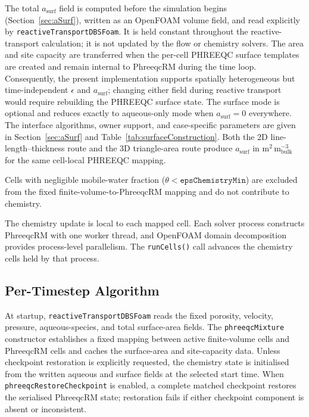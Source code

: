 The total $a_{\mathrm{surf}}$ field is computed before the simulation begins
(Section~\ref{sec:aSurf}), written as an OpenFOAM volume field, and read
explicitly by \texttt{reactiveTransportDBSFoam}. It is held constant throughout
the reactive-transport calculation; it is not updated by the flow or chemistry
solvers. The area and site capacity are transferred when the per-cell
PHREEQC surface templates are created and remain internal to PhreeqcRM during
the time loop. Consequently, the present implementation supports spatially
heterogeneous but time-independent $\epsilon$ and $a_{\mathrm{surf}}$; changing
either field during reactive transport would require rebuilding the PHREEQC
surface state. The surface mode is optional and reduces exactly to
aqueous-only mode when $a_{\mathrm{surf}} = 0$ everywhere.
The interface algorithms, owner support, and case-specific parameters are given
in Section~\ref{sec:aSurf} and Table~\ref{tab:surfaceConstruction}. Both the 2D
line-length--thickness route and the 3D triangle-area route produce
$a_{\mathrm{surf}}$ in m$^2$\,m$^{-3}_{\mathrm{bulk}}$ for the same
cell-local PHREEQC mapping.

Cells with negligible mobile-water fraction
($\theta < \texttt{epsChemistryMin}$) are excluded from the fixed
finite-volume-to-PhreeqcRM mapping and do not contribute to chemistry.

The chemistry update is local to each mapped cell. Each solver process
constructs PhreeqcRM with one worker thread, and OpenFOAM domain decomposition
provides process-level parallelism.
The \texttt{runCells()} call advances the chemistry cells held by that process.

\subsection{Per-Timestep Algorithm}

At startup, \texttt{reactiveTransportDBSFoam} reads the fixed porosity,
velocity, pressure, aqueous-species, and total surface-area fields. The
\texttt{phreeqcMixture} constructor establishes a fixed mapping between active
finite-volume cells and PhreeqcRM cells and caches the surface-area and
site-capacity data. Unless checkpoint restoration is explicitly requested, the
chemistry state is initialised from the written aqueous and surface fields at
the selected start time. When \texttt{phreeqcRestoreCheckpoint} is enabled, a
complete matched checkpoint restores the serialised PhreeqcRM state;
restoration fails if either checkpoint component is absent or inconsistent.

